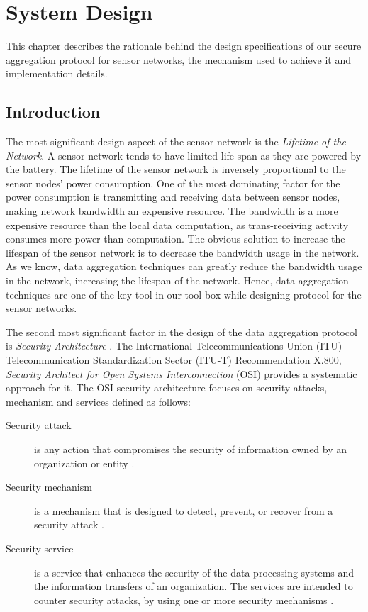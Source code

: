 \chapter{System Design} %
\label{cha:System Design}
	
	This chapter describes the rationale behind the design specifications of our secure aggregation protocol for sensor networks, the mechanism used to achieve it and implementation details.

	\section{Introduction}

	The most significant design aspect of the sensor network is the \textit{Lifetime of the Network}.
	A sensor network tends to have limited life span as they are powered by the battery.
	The lifetime of the sensor network is inversely proportional to the sensor nodes' power consumption.
	One of the most dominating factor for the power consumption is transmitting and receiving data between sensor nodes, making network bandwidth an expensive resource.
	The bandwidth is a more expensive resource than the local data computation, as trans-receiving activity consumes more power than computation.
	The obvious solution to increase the lifespan of the sensor network is to decrease the bandwidth usage in the network.
	As we know, data aggregation techniques can greatly reduce the bandwidth usage in the network, increasing the lifespan of the network.
	Hence, data-aggregation techniques are one of the key tool in our tool box while designing protocol for the sensor networks.

	The second most significant factor in the design of the data aggregation protocol is \textit{Security Architecture }.
	The International Telecommunications Union (ITU) Telecommunication Standardization Sector (ITU-T) Recommendation X.800, \textit{Security Architect for Open Systems Interconnection} (OSI) provides a systematic approach for it.
	The OSI security architecture focuses on security attacks, mechanism and services defined as follows:
	\begin{description}
		\item[Security attack] is any action that compromises the security of information owned by an organization or entity \cite{stallings2008computer}.
		\item[Security mechanism] is a mechanism that is designed to detect, prevent, or recover from a security attack
		\cite{stallings2008computer}.
		\item[Security service] is a service that enhances the security of the data processing systems and the information transfers of an organization. The services are intended to counter security attacks, by using one or more security mechanisms \cite{stallings2008computer}.

	\end{description}

